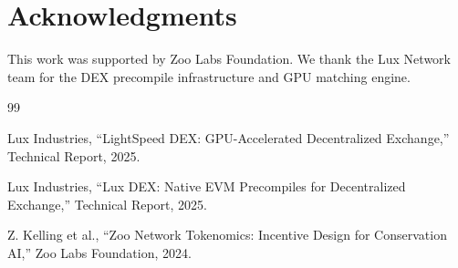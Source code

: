 \section*{Acknowledgments}


This work was supported by Zoo Labs Foundation. We thank the Lux Network team for the DEX precompile infrastructure and GPU matching engine.


\begin{thebibliography}{99}

Lux Industries, ``LightSpeed DEX: GPU-Accelerated Decentralized Exchange,'' Technical Report, 2025.

Lux Industries, ``Lux DEX: Native EVM Precompiles for Decentralized Exchange,'' Technical Report, 2025.

Z. Kelling et al., ``Zoo Network Tokenomics: Incentive Design for Conservation AI,'' Zoo Labs Foundation, 2024.

\end{thebibliography}

